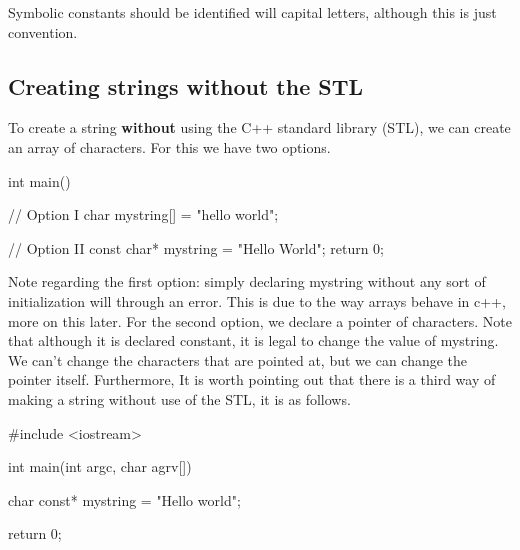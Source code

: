 \documentclass{report}
\begin{document}
%     
%     
%     
%     
    \begin{notebox}
			Symbolic constants should be identified will capital letters, although this is just convention.
		\end{notebox}
    \pagebreak
    \subsection{Creating strings without the STL}
    To create a string \textbf{without} using the C++ standard library (STL), we can create an array of characters. For this we have two options.
    \bigbreak \noindent 
    
    \begin{cppcode}
int main() {

    // Option I
    char mystring[] = "hello world";

    // Option II
    const char* mystring = "Hello World";
    return 0;
}
    \end{cppcode}
    
    \bigbreak \noindent 
    Note regarding the first option: simply declaring mystring without any sort of initialization will through an error. This is due to the way arrays behave in c++, more on this later.
    \bigbreak \noindent 
    For the second option, we declare a pointer of characters. Note that although it is declared constant, it is legal to change the value of mystring. We can't change the characters that are pointed at, but we can change the pointer itself.
    \bigbreak \noindent 
    Furthermore, It is worth pointing out that there is a third way of making a string without use of the STL, it is as follows.
    \bigbreak \noindent 
    
    \begin{cppcode}
#include <iostream>

int main(int argc, char agrv[]){

    char const* mystring = "Hello world";

    return 0;
}
    \end{cppcode}
    
\end{document}

